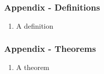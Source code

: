 \documentclass[
    11pt, %
    aspectratio=169, %
]{beamer}
\begin{document}
\begin{frame}[noframenumbering]
\label{Definitions}
	\frametitle{Appendix - Definitions}
         \begin{enumerate}
             \item A definition \newline
         \end{enumerate}

        \hyperlink{Test Stat}{}
\end{frame}

\begin{frame}[noframenumbering]
\label{Theorems}
	\frametitle{Appendix - Theorems}
         \begin{enumerate}
             \item A theorem\newline
         \end{enumerate}

        \hyperlink{Test Stat}{}
\end{frame}
\end{document}
